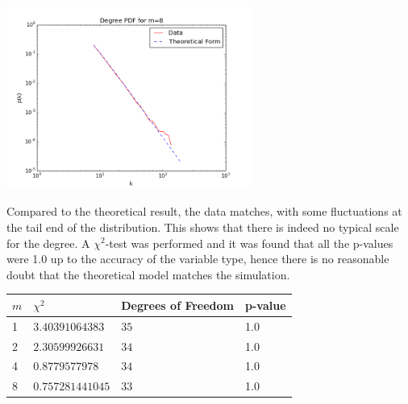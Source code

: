 \documentclass[twoside]{article}
\begin{document}
\begin{multicols}{2}
\begin{center}
\end{center}
\begin{center}
  \includegraphics[height=60mm]{comparison3.png}
\end{center}
\end{multicols}
Compared to the theoretical result, the data matches, with some fluctuations at the tail end of the distribution. This shows that there is indeed no typical scale for the degree. A $\chi^2$-test was performed and it was found that all the p-values were 1.0 up to the accuracy of the variable type, hence there is no reasonable doubt that the theoretical model matches the simulation.
\begin{center}
    \begin{tabular}{|l|l|l|l|}
    \hline
    $m$ & $\chi^2$ & Degrees of Freedom &p-value \\ \hline
    1 & $3.40391064383 $ & $35$ & 1.0\\ \hline
    2 & $2.30599926631 $ & $34$& 1.0\\ \hline
    4 &  $0.8779577978 $ & $34$&1.0\\ \hline
    8 &  $0.757281441045$ & $33$&1.0\\ \hline
    \end{tabular}
\end{center}
\end{document}
